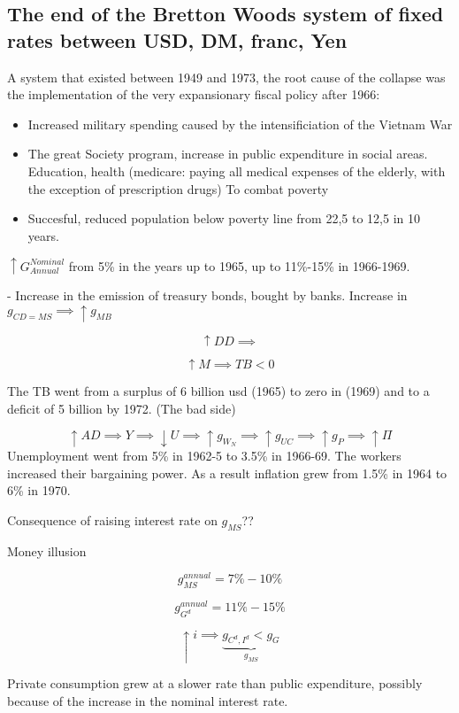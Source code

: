 \documentclass{report}
\begin{document}
\subsection{The end of the Bretton Woods system of fixed rates between USD, DM, franc, Yen}
 A system that existed between 1949 and 1973, the root cause of the collapse was the implementation of the very expansionary fiscal policy after 1966:
 \begin{itemize}
     \item Increased military spending caused by the intensificiation of the Vietnam War
     \item The great Society program, increase in public expenditure in social areas. Education, health (medicare: paying all medical expenses of the elderly, with the exception of prescription drugs) To combat poverty
     \item Succesful, reduced population below poverty line from 22,5 to 12,5 in 10 years. 
 \end{itemize}

$\uparrow G_{Annual}^{Nominal}$ from 5\% in the years up to 1965, up to 11\%-15\% in 1966-1969. 

 - Increase in the emission of treasury bonds, bought by banks. Increase in $g_{CD = MS} \implies \uparrow g_{MB}$

$$\uparrow DD \implies$$

$$\uparrow M \implies TB < 0$$

The TB went from a surplus of 6 billion usd (1965) to zero in (1969) and to a deficit of 5 billion by 1972. (The bad side)

$$\uparrow AD \implies Y \implies \downarrow U \implies  \uparrow g_{W_N} \implies \uparrow g_{UC} \implies \uparrow g_{P} \implies \uparrow \Pi$$
Unemployment went from 5\% in 1962-5 to 3.5\% in 1966-69. The workers increased their bargaining power. As a result inflation grew from 1.5\% in 1964 to 6\% in 1970. 

Consequence of raising interest rate on $g_{MS}$??

Money illusion

$$g_{MS}^{annual} = 7\% - 10\%$$

$$g_{G^d}^{annual} = 11\% - 15\%$$

$$\uparrow i \implies \underbrace{g_{C^d, I^d} < g_G}_{g_{MS}}$$

Private consumption grew at a slower rate than public expenditure, possibly because of the increase in the nominal interest rate.
\end{document}
